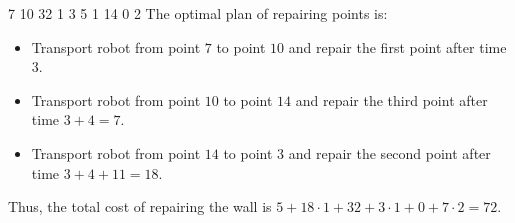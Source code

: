  7
10 32 1
3 5 1
14 0 2
\sampleCOMMENT
The optimal plan of repairing points is:
\begin{itemize}
	\item Transport robot from point $7$ to point $10$ and repair the first point after time $3$.
	\item Transport robot from point $10$ to point $14$ and repair the third point after time $3 + 4 = 7$.
	\item Transport robot from point $14$ to point $3$ and repair the second point after time $3 + 4 + 11 = 18$.
\end{itemize}
Thus, the total cost of repairing the wall is $5 + 18 \cdot 1 + 32 + 3 \cdot 1 + 0 + 7 \cdot 2 = 72$.
\sampleEND



